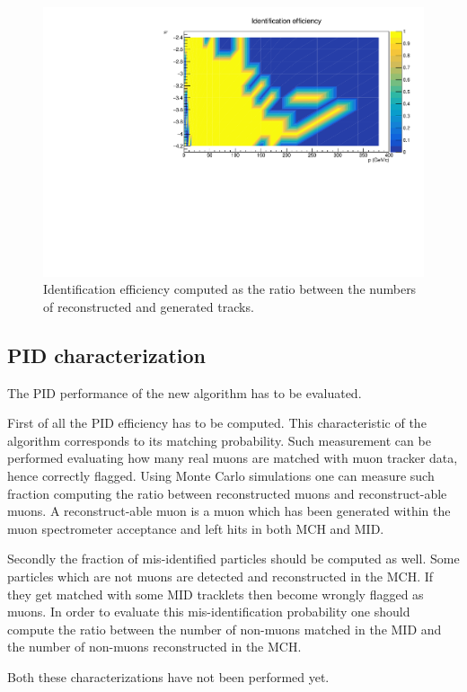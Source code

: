 \begin{figure}[!]
\begin{center}
\includegraphics[width=0.9\linewidth]{Chapters/O2/Figs/ID_eff.pdf}
\caption{Identification efficiency computed as the ratio between the numbers of reconstructed and generated tracks.}
\label{fig:ID_eff}
\end{center}
\end{figure}

\subsection{PID characterization}
The PID performance of the new algorithm has to be evaluated.

First of all the PID efficiency has to be computed.
This characteristic of the algorithm corresponds to its matching probability.
Such measurement can be performed evaluating how many real muons are matched with muon tracker data, hence correctly flagged.
Using Monte Carlo simulations one can measure such fraction computing the ratio between reconstructed muons and reconstruct-able muons.
A reconstruct-able muon is a muon which has been generated within the muon spectrometer acceptance and left hits in both MCH and MID.

Secondly the fraction of mis-identified particles should be computed as well.
Some particles which are not muons are detected and reconstructed in the MCH.
If they get matched with some MID tracklets then become wrongly flagged as muons.
In order to evaluate this mis-identification probability one should compute the ratio between the number of non-muons matched in the MID and the number of non-muons reconstructed in the MCH.

Both these characterizations have not been performed yet.


